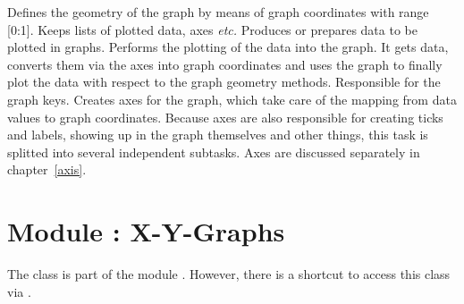 \begin{definitions}
  Defines the geometry of the graph by means of graph coordinates with
  range [0:1]. Keeps lists of plotted data, axes \emph{etc.}
  Produces or prepares data to be plotted in graphs.
  Performs the plotting of the data into the graph. It gets data,
  converts them via the axes into graph coordinates and uses the graph
  to finally plot the data with respect to the graph geometry methods.
  Responsible for the graph keys.
  Creates axes for the graph, which take care of the mapping from data
  values to graph coordinates. Because axes are also responsible for
  creating ticks and labels, showing up in the graph themselves and
  other things, this task is splitted into several independent
  subtasks. Axes are discussed separately in chapter~\ref{axis}.
\end{definitions}

\section{Module : X-Y-Graphs}
\label{graph:graph}


The class  is part of the module .
However, there is a shortcut to access this class via
.

